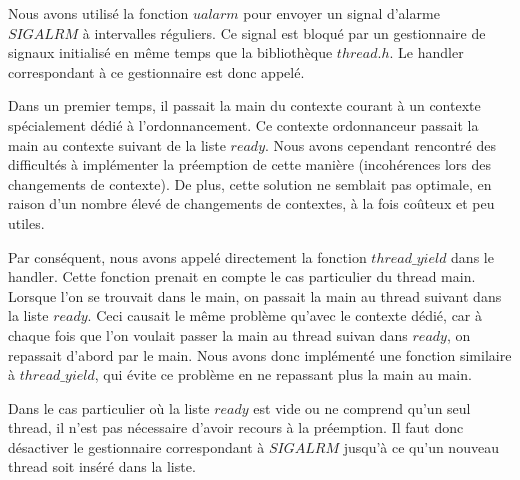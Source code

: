 Nous avons utilisé la fonction $ualarm$ pour envoyer un signal d'alarme $SIGALRM$ à intervalles réguliers. Ce signal est bloqué par un gestionnaire de signaux initialisé en même temps que la bibliothèque $thread.h$. Le handler correspondant à ce gestionnaire est donc appelé. 

Dans un premier temps, il passait la main du contexte courant à un contexte spécialement dédié à l'ordonnancement. Ce contexte ordonnanceur passait la main au contexte suivant de la liste $ready$.  Nous avons cependant rencontré des difficultés à implémenter la préemption de cette manière (incohérences lors des changements de contexte). De plus, cette solution ne semblait pas optimale, en raison d'un nombre élevé de changements de contextes, à la fois coûteux et peu utiles.

Par conséquent, nous avons appelé directement la fonction $thread\_yield$ dans le handler. Cette fonction prenait en compte le cas particulier du thread main. Lorsque l'on se trouvait dans le main, on passait la main au thread suivant dans la liste $ready$. Ceci causait le même problème qu'avec le contexte dédié, car à chaque fois que l'on voulait passer la main au thread suivan dans $ready$, on repassait d'abord par le main. Nous avons donc implémenté une fonction similaire à $thread\_yield$, qui évite ce problème en ne repassant plus la main au main. 

Dans le cas particulier où la liste $ready$ est vide ou ne comprend qu'un seul
thread, il n'est pas nécessaire d'avoir recours à la préemption. Il faut donc
désactiver le gestionnaire correspondant à $SIGALRM$ jusqu'à ce qu'un nouveau
thread soit inséré dans la liste.

